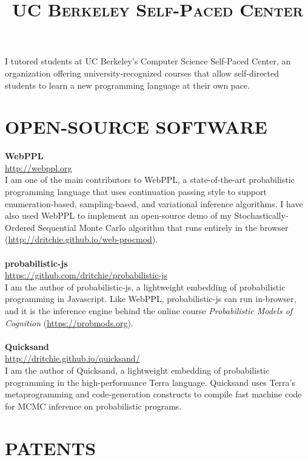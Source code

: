 \documentclass[line,margin]{res}
\begin{document}
\begin{resume}
\title{\textsc{UC Berkeley Self-Paced Center}}
\begin{position}
I tutored students at UC Berkeley's Computer Science Self-Paced Center, an organization offering university-recognized courses that allow self-directed students to learn a new programming language at their own pace.
\end{position}




\section{OPEN-SOURCE SOFTWARE}

\textbf{WebPPL} \\
\url{http://webppl.org} \\
I am one of the main contributors to WebPPL, a state-of-the-art probabilistic programming language that uses continuation passing style to support enumeration-based, sampling-based, and variational inference algorithms. I have also used WebPPL to implement an open-source demo of my Stochastically-Ordered Sequential Monte Carlo algorithm that runs entirely in the browser (\url{http://dritchie.github.io/web-procmod}).
\\ \\
\textbf{probabilistic-js} \\
\url{https://github.com/dritchie/probabilistic-js} \\
I am the author of probabilistic-js, a lightweight embedding of probabilistic programming in Javascript. Like WebPPL, probabilistic-js can run in-browser, and it is the inference engine behind the online course \emph{Probabilistic Models of Cognition} (\url{https://probmods.org}).
\\ \\
\textbf{Quicksand} \\
\url{http://dritchie.github.io/quicksand/} \\
I am the author of Quicksand, a lightweight embedding of probabilistic programming in the high-performance Terra language. Quicksand uses Terra's metaprogramming and code-generation constructs to compile fast machine code for MCMC inference on probabilistic programs.


\section{PATENTS}


\end{resume}
\end{document}
